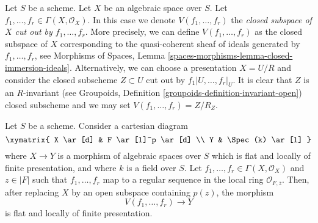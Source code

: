 \noindent
Let $S$ be a scheme. Let $X$ be an algebraic space over $S$.
Let $f_1, \ldots, f_r \in \Gamma(X, \mathcal{O}_X)$. In this case we
denote $V(f_1, \ldots, f_r)$ the {\it closed subspace of $X$ cut out by
$f_1, \ldots, f_r$}. More precisely, we can define $V(f_1, \ldots, f_r)$
as the closed subspace of $X$ corresponding to the quasi-coherent sheaf
of ideals generated by $f_1, \ldots, f_r$, see
Morphisms of Spaces, Lemma
\ref{spaces-morphisms-lemma-closed-immersion-ideals}.
Alternatively, we can choose a presentation $X = U/R$ and consider the
closed subscheme $Z \subset U$ cut out by $f_1|U, \ldots, f_r|_U$.
It is clear that $Z$ is an $R$-invariant (see
Groupoids, Definition \ref{groupoids-definition-invariant-open})
closed subscheme and we may set $V(f_1, \ldots, f_r) = Z/R_Z$.

\begin{lemma}
\label{lemma-slice}
Let $S$ be a scheme. Consider a cartesian diagram
$$
\xymatrix{
X \ar[d] & F \ar[l]^p \ar[d] \\
Y & \Spec(k) \ar[l]
}
$$
where $X \to Y$ is a morphism of algebraic spaces over $S$
which is flat and locally of finite presentation, and where
$k$ is a field over $S$. Let $f_1, \ldots, f_r \in \Gamma(X, \mathcal{O}_X)$
and $z \in |F|$ such that $f_1, \ldots, f_r$ map to a regular sequence
in the local ring $\mathcal{O}_{F, \overline{z}}$.
Then, after replacing $X$ by an open subspace containing $p(z)$, the morphism
$$
V(f_1, \ldots, f_r) \longrightarrow Y
$$
is flat and locally of finite presentation.
\end{lemma}

